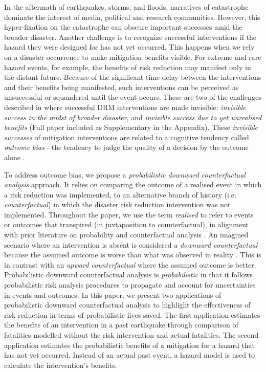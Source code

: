 In the aftermath of earthquakes, storms, and floods, narratives of catastrophe dominate the interest of media, political and research communities. However, this hyper-fixation on the catastrophe can obscure important successes amid the broader disaster. Another challenge is to recognize successful interventions if the hazard they were designed for has not yet occurred. This happens when we rely on a disaster occurrence to make mitigation benefits visible. For extreme and rare hazard events, for example, the benefits of risk reduction may manifest only in the distant future. Because of the significant time delay between the interventions and their benefits being manifested, such interventions can be perceived as unsuccessful or squandered until the event occurs. These are two of the challenges described in \cite{lallemant_rabonza_gar_2022} where successful DRM interventions are made invisible: \textit{invisible success in the midst of broader disaster}, and \textit{invisible success due to yet unrealised benefits} (Full paper included as Supplementary in the Appendix). These \textit{invisible successes} of mitigation interventions are related to a cognitive tendency called \textit{outcome bias} - the tendency to judge the quality of a decision by the outcome alone \citep{robson_2019}. 

To address outcome bias, we propose a \textit{probabilistic downward counterfactual analysis} approach. It relies on comparing the outcome of a realised event in which a risk reduction was implemented, to an alternative branch of history (i.e. \textit{counterfactual}) in which the disaster risk reduction intervention was not implemented.  Throughout the paper, we use the term \textit{realised}  to refer to events or outcomes that transpired (in juxtaposition to counterfactual), in alignment with prior literature on probability and counterfactual analysis \citep{roese1997counterfactual}.  An imagined scenario where an intervention is absent is considered a \textit{downward counterfactual} because the assumed outcome is worse than what was observed in reality \citep{roese1997counterfactual}.  This is in contrast with an \textit{upward counterfactual} where the assumed outcome is better. Probabilistic downward counterfactual analysis is \textit{probabilistic} in that it follows probabilistic risk analysis procedures to propagate and account for uncertainties in events and outcomes. In this paper, we present two applications of probabilistic downward counterfactual analysis to highlight the effectiveness of risk reduction in terms of probabilistic lives saved. The first application estimates the benefits of an intervention in a past earthquake through comparison of fatalities modelled without the risk intervention and actual fatalities. The second application estimates the probabilistic benefits of a mitigation for a hazard that has not yet occurred. Instead of an actual past event, a hazard model is used to calculate the intervention's benefits.

